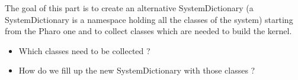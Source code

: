 %
%
%
%

\goal
The goal of this part is to create an alternative SystemDictionary (a SystemDictionary is a namespace holding all the classes of the system) starting from the \gls{Pharo} one and to collect classes which are needed to build the kernel. 

\problems
\begin{itemize}
	\item Which classes need to be collected ?
	\item How do we fill up the new SystemDictionary with those classes ?
\end{itemize}

